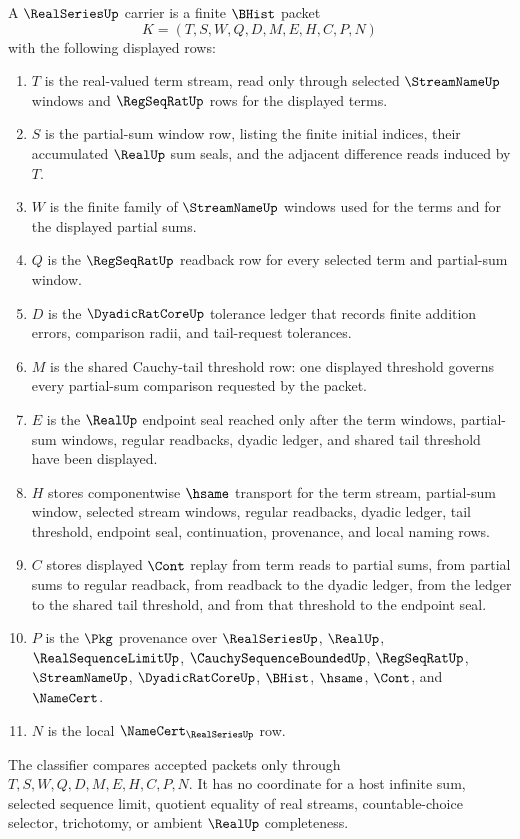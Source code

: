 \begin{definition}\label{def:real-series-carrier}
A $\RealSeriesUp$ carrier is a finite $\BHist$ packet
$$
K=(T,S,W,Q,D,M,E,H,C,P,N)
$$
with the following displayed rows:
\begin{enumerate}
\item $T$ is the real-valued term stream, read only through selected $\StreamNameUp$ windows and $\RegSeqRatUp$ rows for the displayed terms.
\item $S$ is the partial-sum window row, listing the finite initial indices, their accumulated $\RealUp$ sum seals, and the adjacent difference reads induced by $T$.
\item $W$ is the finite family of $\StreamNameUp$ windows used for the terms and for the displayed partial sums.
\item $Q$ is the $\RegSeqRatUp$ readback row for every selected term and partial-sum window.
\item $D$ is the $\DyadicRatCoreUp$ tolerance ledger that records finite addition errors, comparison radii, and tail-request tolerances.
\item $M$ is the shared Cauchy-tail threshold row: one displayed threshold governs every partial-sum comparison requested by the packet.
\item $E$ is the $\RealUp$ endpoint seal reached only after the term windows, partial-sum windows, regular readbacks, dyadic ledger, and shared tail threshold have been displayed.
\item $H$ stores componentwise $\hsame$ transport for the term stream, partial-sum window, selected stream windows, regular readbacks, dyadic ledger, tail threshold, endpoint seal, continuation, provenance, and local naming rows.
\item $C$ stores displayed $\Cont$ replay from term reads to partial sums, from partial sums to regular readback, from readback to the dyadic ledger, from the ledger to the shared tail threshold, and from that threshold to the endpoint seal.
\item $P$ is the $\Pkg$ provenance over $\RealSeriesUp$, $\RealUp$, $\RealSequenceLimitUp$, $\CauchySequenceBoundedUp$, $\RegSeqRatUp$, $\StreamNameUp$, $\DyadicRatCoreUp$, $\BHist$, $\hsame$, $\Cont$, and $\NameCert$.
\item $N$ is the local $\NameCert_{\RealSeriesUp}$ row.
\end{enumerate}
The classifier compares accepted packets only through $T,S,W,Q,D,M,E,H,C,P,N$. It has no coordinate for a host infinite sum, selected sequence limit, quotient equality of real streams, countable-choice selector, trichotomy, or ambient $\RealUp$ completeness.
\end{definition}


